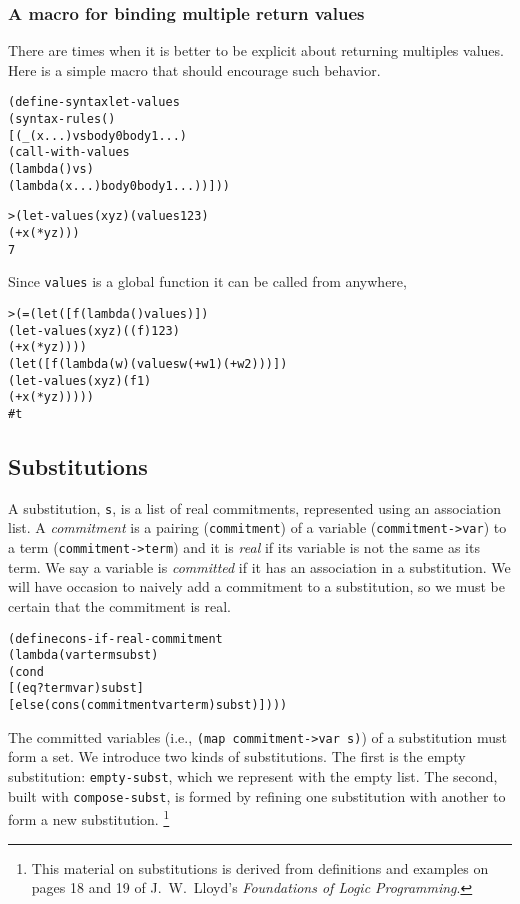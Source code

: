 \subsubsection{A macro for binding multiple return values}

There are times when it is better to be explicit about returning
multiples values.  Here is a simple macro that should encourage
such behavior.

\begin{alltt}
(define-syntax let-values
  (syntax-rules ()
    [(_ (x ...) vs body0 body1 ...)
     (call-with-values
       (lambda () vs)
       (lambda (x ...) body0 body1 ...))]))

> (let-values (x y z) (values 1 2 3)
    (+ x (* y z)))
7
\end{alltt}

Since \texttt{values} is a global function it can be called from
anywhere,
\begin{alltt}
> (= (let ([f (lambda () values)])
       (let-values (x y z) ((f) 1 2 3)
         (+ x (* y z))))
     (let ([f (lambda (w) (values w (+ w 1) (+ w 2)))])
       (let-values (x y z) (f 1)
         (+ x (* y z)))))
#t
\end{alltt}

\subsection{Substitutions}

A substitution, \texttt{s}, is a list of real commitments, represented
using an association list. A \emph{commitment} is a pairing
(\texttt{commitment}) of a variable (\texttt{commitment->var}) to a
term (\texttt{commitment->term}) and it is \emph{real} if its variable
is not the same as its term.  We say a variable is \emph{committed} if
it has an association in a substitution.  We will have occasion to
naively add a commitment to a substitution, so we must be certain that
the commitment is real.

\begin{alltt}
(define cons-if-real-commitment
  (lambda (var term subst)
    (cond
      [(eq? term var) subst]
      [else (cons (commitment var term) subst)])))
\end{alltt}

\noindent
The committed variables (i.e., \texttt{(map commitment->var s)}) of a
substitution must form a set.  We introduce two kinds of
substitutions.  The first is the empty substitution:
\texttt{empty-subst}, which we represent with the empty list.  The
second, built with \texttt{compose-subst}, is formed by refining one
substitution with another to form a new substitution.
\footnote{This material on substitutions is derived from
definitions and examples on pages 18 and 19 of J.\ W.\ Lloyd's
\emph{Foundations of Logic Programming}.}

